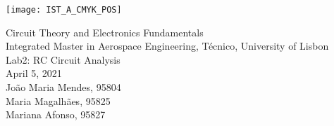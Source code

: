 
\thispagestyle {empty}

\texttt{[image: IST\_A\_CMYK\_POS]}

\begin{center}
%
\vspace{1.0cm}

\vspace{1cm}
{\FontLb Circuit Theory and Electronics Fundamentals} \\ %
\vspace{1cm}
{\FontSn Integrated Master in Aerospace Engineering, Técnico, University of Lisbon} \\ %
\vspace{1cm}
{\FontSn Lab2: RC Circuit Analysis} \\
\vspace{1cm}
{\FontSn April 5, 2021} \\ %
\vspace{1cm}
{\FontSn Jo\~{a}o Maria Mendes, 95804 \\ Maria Magalh\~{a}es, 95825 \\ Mariana Afonso, 95827}
 
%
\end{center}

